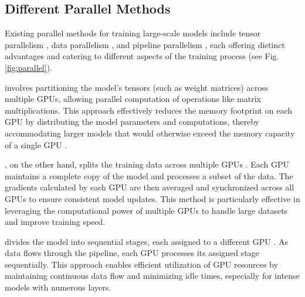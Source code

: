 
\subsection{Different Parallel Methods}\label{sec:moti:parallel}

\par Existing parallel methods for training large-scale models include tensor parallelism \cite{narayanan2021efficient}, data parallelism \cite{hillis1986data, li2020pytorch, agarwal2012reoptimizing}, and pipeline parallelism \cite{li2021terapipe, kim2023bpipe, yang2021pipemare, narayanan2021memory, zhao2021v}, each offering distinct advantages and catering to different aspects of the training process (see Fig. \ref{fig:parallel}). 

 involves partitioning the model's tensors (such as weight matrices) across multiple GPUs, allowing parallel computation of operations like matrix multiplications. 
This approach effectively reduces the memory footprint on each GPU by distributing the model parameters and computations, thereby accommodating larger models that would otherwise exceed the memory capacity of a single GPU \cite{narayanan2021efficient}.

, on the other hand, splits the training data across multiple GPUs \cite{hillis1986data, li2020pytorch, agarwal2012reoptimizing}. Each GPU maintains a complete copy of the model and processes a subset of the data. The gradients calculated by each GPU are then averaged and synchronized across all GPUs to ensure consistent model updates. This method is particularly effective in leveraging the computational power of multiple GPUs to handle large datasets and improve training speed. 

 divides the model into sequential stages, each assigned to a different GPU \cite{li2021terapipe, kim2023bpipe, yang2021pipemare, narayanan2021memory, zhao2021v}. As data flows through the pipeline, each GPU processes its assigned stage sequentially. This approach enables efficient utilization of GPU resources by maintaining continuous data flow and minimizing idle times, especially for intense models with numerous layers.

